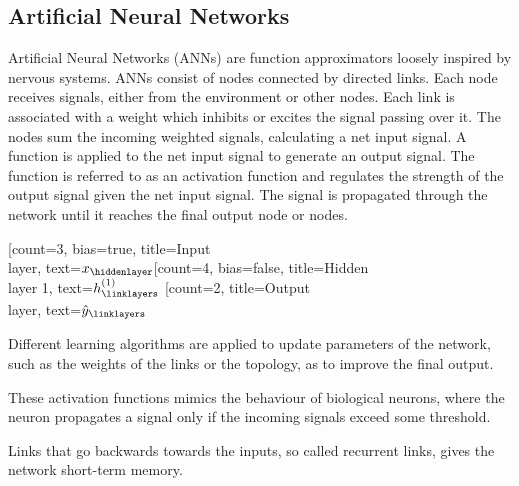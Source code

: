 \subsection{Artificial Neural Networks}
Artificial Neural Networks (ANNs) are function approximators loosely inspired by nervous systems.
ANNs consist of nodes connected by directed links. Each node receives signals, either from
the environment or other nodes. Each link is associated with a weight which inhibits or excites the signal passing
over it. The nodes sum the incoming weighted signals, calculating a net input signal. A function
is applied to the net input signal to generate an output signal. The function is referred to as an activation function
and regulates the strength of the output signal given the net input signal. The signal is propagated through the network
until it reaches the final output node or nodes.




\label{Neural networks figure}

\begin{neuralnetwork}[height=4]
    \newcommand{\x}[2]{$x_#2$}
    \newcommand{\y}[2]{$\hat{y}_#2$}
    \newcommand{\hfirst}[2]{\small $h^{(1)}_#2$}
    \newcommand{\hsecond}[2]{\small $h^{(2)}_#2$}
    [count=3, bias=true, title=Input\\layer, text=\x]
    \hiddenlayer[count=4, bias=false, title=Hidden\\layer 1, text=\hfirst] \linklayers
    \outputlayer[count=2, title=Output\\layer, text=\y] \linklayers
\end{neuralnetwork}


Different learning algorithms are applied to update parameters of the network, such as the weights of the
links or the topology, as to improve the final output.

These activation functions mimics the behaviour of biological neurons, where the neuron propagates
a signal only if the incoming signals exceed some threshold.


Links that go backwards towards the inputs, so called recurrent links, gives the network short-term memory.

